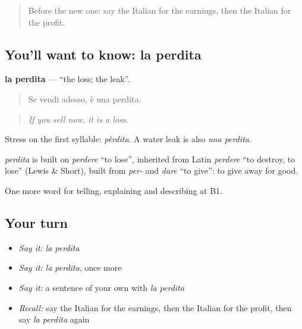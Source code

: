 \label{lesson:IT-C398-perdita}



\begin{quote}
Before the new one: say the Italian for the earnings, then the Italian for the profit.
\end{quote}

\subsection*{You'll want to know: la perdita}
\textbf{la perdita} — \textquotedblleft{}the loss; the leak\textquotedblright{}.

\begin{quote}
Se vendi adesso, è una perdita.
\end{quote}

\begin{quote}
\emph{If you sell now, it is a loss.}
\end{quote}

Stress on the first syllable: \emph{pèrdita}. A water leak is also \emph{una perdita}.

\begin{cousinweb}
\emph{perdita} is built on \emph{perdere} \textquotedblleft{}to lose\textquotedblright{}, inherited from Latin \emph{perdere} \textquotedblleft{}to destroy, to lose\textquotedblright{} (Lewis \& Short), built from \emph{per-} and \emph{dare} \textquotedblleft{}to give\textquotedblright{}: to give away for good.
\end{cousinweb}

\begin{grammarlens}[title={What you've built}]
One more word for telling, explaining and describing at B1.
\end{grammarlens}

\subsection*{Your turn}
\begin{itemize}
\raggedright
  \item \emph{Say it:} \emph{la perdita}
  \item \emph{Say it:} \emph{la perdita}, once more
  \item \emph{Say it:} a sentence of your own with \emph{la perdita}
  \item \emph{Recall:} say the Italian for the earnings, then the Italian for the profit, then say \emph{la perdita} again
\end{itemize}

